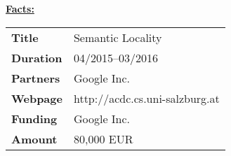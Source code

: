 \textcolor{\workinggroupboxtextcolor}{
	\textbf{\underline{Facts:}}
	\newline
	\newline
	\begin{tabular}{l p{}}
		\textbf{Title} & Semantic Locality \\
		\textbf{Duration} & 04/2015--03/2016 \\
		\textbf{Partners} & Google Inc. \\
		\textbf{Webpage} & http://acdc.cs.uni-salzburg.at \\
		\textbf{Funding} & Google Inc. \\
		\textbf{Amount} & 80,000 EUR 
	\end{tabular}
}